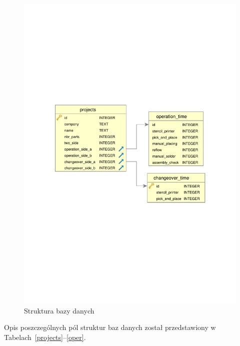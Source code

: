 \begin{figure}[H]
	\centering
	\includegraphics[scale=0.9]{chapters/chapter4/db_crop.pdf}
	\caption{Struktura bazy danych}
	\label{baza_danych}
\end{figure}


Opis poszczególnych pól struktur baz danych został przedstawiony w Tabelach~\ref{projects}--\ref{oper}.

